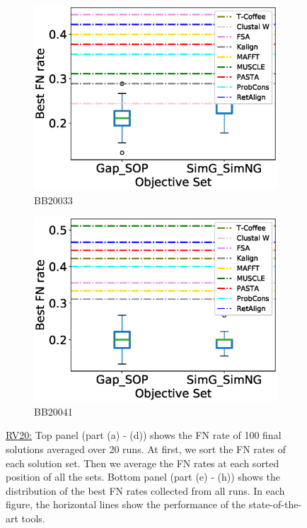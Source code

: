 \begin{figure}[!htbp]
\begin{adjustwidth}{-1.5cm}{-1cm}
\begin{subfigure}{0.22\textwidth}
			\includegraphics[width=\columnwidth]{Figure/summary/precomputedInit/Balibase/BB20033_objset_fnrate_rank}
			\caption{BB20033}
		\end{subfigure}
		\begin{subfigure}{0.22\textwidth}
			\includegraphics[width=\columnwidth]{Figure/summary/precomputedInit/Balibase/BB20041_objset_fnrate_rank}
			\caption{BB20041}
		\end{subfigure}
		\end{adjustwidth}
		\caption[FN rate results on RV20]{\underline{RV20:} Top panel (part (a) - (d)) shows the FN rate of 100 final solutions averaged over 20 runs. At first, we sort the FN rates of each solution set. Then we average the FN rates at each sorted position of all the sets. Bottom panel (part (e) - (h)) shows the distribution of the best FN rates collected from all runs. In each figure, the horizontal lines show the performance of the state-of-the-art tools.}
		\label{fig:rv20_fn_rate}

\end{figure}


